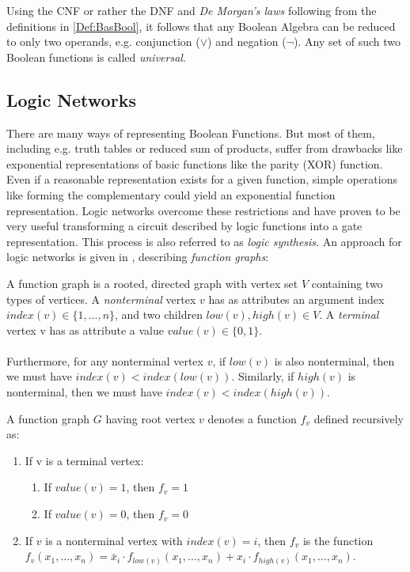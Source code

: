 Using the CNF or rather the DNF and \textit{De Morgan's laws} following from the definitions in \ref{Def:BasBool}, it follows that any Boolean Algebra can be reduced to only two operands, e.g. conjunction ($\vee$) and negation ($\neg$). Any set of such two Boolean functions is called \textit{universal}.


\subsection{Logic Networks}

There are many ways of representing Boolean Functions. But most of them, including e.g. truth tables or reduced sum of products, suffer from drawbacks like exponential representations of basic functions like the parity (XOR) function. Even if a reasonable representation exists for a given function, simple operations like forming the complementary could yield an exponential function representation. Logic networks overcome these restrictions and have proven to be very useful transforming a circuit described by logic functions into a gate representation. This process is also referred to as \textit{logic synthesis}. An approach for logic networks is given in \cite{LogicNetwork}, describing \textit{function graphs}:

\begin{definition}
	A function graph is a rooted, directed graph with vertex set $V$ containing two types of vertices. A \textit{nonterminal} vertex $v$ has as attributes an argument index $index(v) \in \{1, . . .,n\}$, and two children $low(v),high(v) \in V$. A \textit{terminal} vertex v has as attribute a value $value(v)\in\{0,1\}$.\\
	\\
	Furthermore, for any nonterminal vertex $v$, if $low(v)$ is also nonterminal, then we must have
	$index(v) < index(low(v))$. Similarly, if $high(v)$ is nonterminal, then we must have
	$index(v) < index(high(v))$.
\end{definition}

\begin{definition}
	A function graph $G$ having root vertex $v$ denotes a function $f_v$ defined recursively as:
	\begin{enumerate}
		\item If v is a terminal vertex:
		\begin{enumerate}
			\item If $value(v)=1$, then $f_v=1$
			\item If $value(v)=0$, then $f_v=0$
		\end{enumerate}
		\item If $v$ is a nonterminal vertex with $index(v)=i$, then $f_v$ is the function \\ 
		$f_v(x_1, ..., x_n) = \bar{x}_i \cdot f_{low(v)}(x_1, ..., x_n) + x_i \cdot f_{high(v)}(x_1, ..., x_n)$.
	\end{enumerate}
\end{definition}


